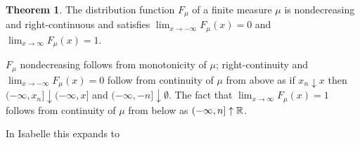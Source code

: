 \documentclass[leqno]{article}
\theoremstyle{definition}
\newtheorem{theorem}{Theorem}[section]
\begin{document}
\begin{theorem}
The distribution function $F_\mu$ of a finite measure $\mu$ is nondecreasing and right-continuous and satisfies $\lim_{x \rightarrow -\infty} F_\mu(x) = 0$ and \linebreak $\lim_{x \rightarrow \infty} F_\mu(x) = 1$.
\end{theorem}

$F_\mu$ nondecreasing follows from monotonicity of $\mu$; right-continuity and \linebreak $\lim_{x \rightarrow -\infty} F_\mu(x) = 0$ follow from continuity of $\mu$ from above as if $x_n \downarrow x$ then $(-\infty, x_n] \downarrow (-\infty, x]$ and $(-\infty, -n] \downarrow \emptyset$. The fact that $\lim_{x \rightarrow \infty} F_\mu(x) = 1$ follows from continuity of $\mu$ from below as $(-\infty, n] \uparrow \mathbb{R}$.

\medskip

In Isabelle this expands to

\medskip
\end{document}

